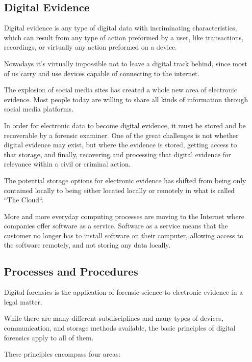 \subsection{Digital Evidence}

Digital evidence is any type of digital data with incriminating characteristics,
which can result from any type of action preformed by a user, like transactions,
recordings, or virtually any action preformed on a device.

Nowadays it's virtually impossible not to leave a digital track behind, since most
of us carry and use devices capable of connecting to the internet.

The explosion of social media sites has created a whole new area of electronic
evidence. Most people today are willing to share all kinds of information through
social media platforms.

In order for electronic data to become digital evidence, it must be stored and be recoverable
by a forensic examiner. One of the great challenges is not whether digital
evidence may exist, but where the evidence is stored, getting access to that storage,
and finally, recovering and processing that digital evidence for relevance within
a civil or criminal action.

The potential storage options for electronic evidence has shifted from being only contained locally
to being either located locally or remotely in what is called ``The Cloud``. 

More and more everyday computing processes are moving to the Internet
where companies offer software as a service. Software as a service means that
the customer no longer has to install software on their computer, allowing access to the software remotely,
and not storing any data locally.


\subsection{Processes and Procedures}

Digital forensics is the application of forensic science to electronic evidence in a
legal matter.

While there are many different subdisciplines and many types of devices, communication,
and storage methods available, the basic principles of digital forensics
apply to all of them.

These principles encompass four areas:

